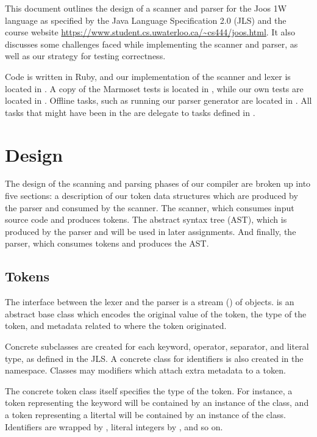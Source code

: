 \documentclass[pdftex,11pt,a4paper]{article}
\begin{document}

This document outlines the design of a scanner and parser for
the Joos 1W language as specified by the Java Language Specification
2.0 (JLS) and the course website
\url{https://www.student.cs.uwaterloo.ca/~cs444/joos.html}. It also
discusses some challenges faced while implementing the scanner and
parser, as well as our strategy for testing correctness.

Code is written in Ruby, and our implementation of the scanner and
lexer is located in . A copy of the Marmoset tests is
located in , while our own tests are located in
. Offline tasks, such as running our parser generator
are located in . All tasks that might have been in
the  are delegate to tasks defined in
.


\section{Design}

The design of the scanning and parsing phases of our compiler are
broken up into five sections: a description of our token data
structures which are produced by the parser and consumed by the
scanner. The scanner, which consumes input source code and produces
tokens. The abstract syntax tree (AST), which is produced by the
parser and will be used in later assignments. And finally, the parser,
which consumes tokens and produces the AST.


\subsection{Tokens}

The interface between the lexer and the parser is a stream
() of  objects. 
is an abstract base class which encodes the original value of the
token, the type of the token, and metadata related to where the token
originated.

Concrete subclasses are created for each keyword, operator, separator,
and literal type, as defined in the JLS. A concrete class for
identifiers is also created in the 
namespace. Classes may  modifiers which attach extra
metadata to a token.

The concrete token class itself specifies the type of the
token. For instance, a token representing the keyword  will
be contained by an instance of the  class, and
a token representing a litertal  will be contained by an
instance of the  class. Identifiers are wrapped
by , literal integers by
, and so on.
\end{document}
